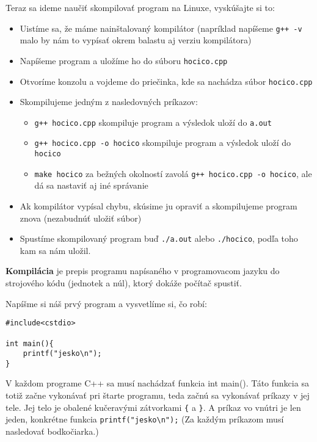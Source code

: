 Teraz sa ideme naučiť skompilovať program na Linuxe, vyskúšajte si to:
\begin{itemize}
    \item Uistíme sa, že máme nainštalovaný kompilátor (napríklad napíšeme \verb!g++ -v! malo by nám to 
    vypísať okrem balastu aj verziu kompilátora)
    \item Napíšeme program a uložíme ho do súboru \verb!hocico.cpp!
    \item Otvoríme konzolu a vojdeme do priečinka, kde sa nachádza súbor \verb!hocico.cpp!
    \item Skompilujeme jedným z nasledovných príkazov:
    \begin{itemize}
        \item \verb!g++ hocico.cpp! skompiluje program a výsledok uloží do \verb!a.out!
        \item \verb!g++ hocico.cpp -o hocico! skompiluje program a výsledok uloží do \verb!hocico!
        \item \verb!make hocico! za bežných okolností zavolá \verb!g++ hocico.cpp -o hocico!, ale dá
        sa nastaviť aj iné správanie
    \end{itemize}
    \item Ak kompilátor vypísal chybu, skúsime ju opraviť a skompilujeme
    program znova (nezabudnúť uložiť súbor) 
    \item Spustíme skompilovaný program
    buď \verb!./a.out! alebo \verb!./hocico!, podľa toho kam sa nám uložil.
    
\end{itemize}


\textbf{Kompilácia} je prepis programu napísaného v programovacom jazyku do
strojového kódu (jednotek a núl), ktorý dokáže počítač spustiť.


Napíšme si náš prvý program a vysvetlíme si, čo robí:
\begin{lstlisting}
#include<cstdio>

int main(){
    printf("jesko\n");
}
\end{lstlisting}

V každom programe C++ sa musí nachádzať funkcia int main(). Táto funkcia sa
totiž začne vykonávať pri štarte programu, teda začnú sa vykonávať príkazy v
jej tele.  Jej telo je obalené kučeravými zátvorkami \verb'{' a \verb'}'. A
príkaz vo vnútri je len jeden, konkrétne funkcia \verb!printf("jesko\n");! (Za
každým príkazom musí nasledovať bodkočiarka.)

